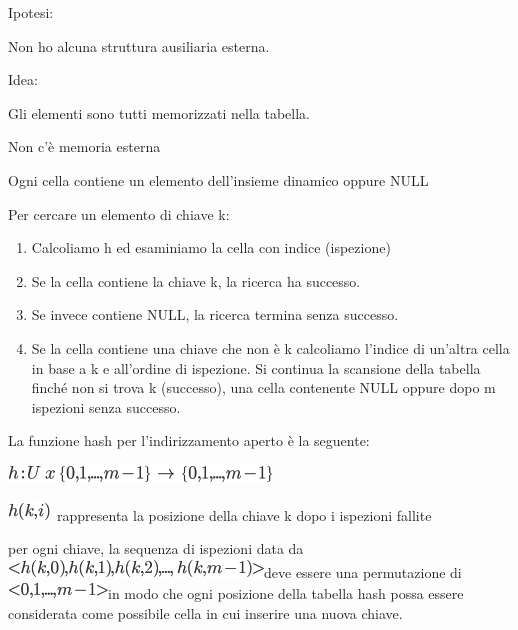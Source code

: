 \documentclass{article}
\providecommand{\tightlist}{%
  \setlength{\itemsep}{0pt}\setlength{\parskip}{0pt}}
\begin{document}
{Ipotesi: }

{Non ho alcuna struttura ausiliaria esterna.}

{}

{Idea:}

{Gli elementi sono tutti memorizzati nella tabella.}

{Non c'è memoria esterna}

{}

{Ogni cella contiene un elemento dell'insieme dinamico oppure NULL}

{}

{Per cercare un elemento di chiave k:}

\begin{enumerate}
\tightlist
\item
  {Calcoliamo h ed esaminiamo la cella con indice (ispezione)}
\item
  {Se la cella contiene la chiave k, la ricerca ha successo. }
\item
  {Se invece contiene NULL, la ricerca termina senza successo.}
\item
  {Se la cella contiene una chiave che non è k calcoliamo l'indice di
  un'altra cella in base a k e all'ordine di ispezione. Si continua la
  scansione della tabella finché non si trova k (successo), una cella
  contenente NULL oppure dopo m ispezioni senza successo.}
\end{enumerate}

{}

{La funzione hash per l'indirizzamento aperto è la seguente:}

\includegraphics{images/image272.png}

\includegraphics{images/image273.png}{~rappresenta la posizione della
chiave k dopo i ispezioni fallite}

{}

{per ogni chiave, la sequenza di ispezioni data da
}\includegraphics{images/image274.png}{deve essere una permutazione di
}\includegraphics{images/image275.png}{in modo che ogni posizione della
tabella hash possa essere considerata come possibile cella in cui
inserire una nuova chiave.}
\end{document}
